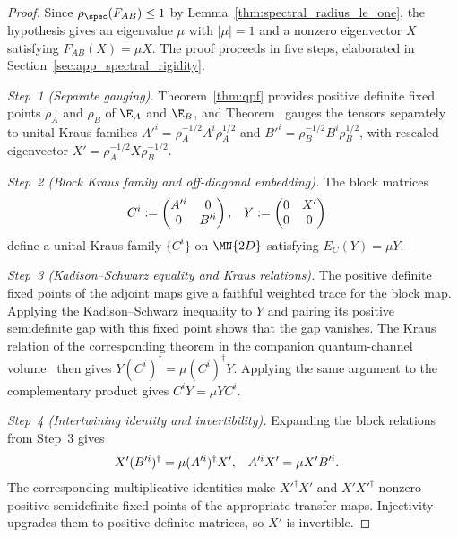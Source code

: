 \begin{proof}
    \leanok
    Since $\rho_{\spec}(F_{AB})\leq1$ by
    Lemma~\ref{thm:spectral_radius_le_one}, the hypothesis gives an
    eigenvalue $\mu$ with $|\mu|=1$ and a nonzero eigenvector $X$ satisfying
    $F_{AB}(X)=\mu X$. The proof proceeds in five steps, elaborated in
    Section~\ref{sec:app_spectral_rigidity}.

    \emph{Step~1 (Separate gauging).}
    Theorem~\ref{thm:qpf} provides positive definite fixed points $\rho_A$ and
    $\rho_B$ of $\E_A$ and $\E_B$, and
    Theorem~\cite[``Right-canonical (unital) gauge'']{QICLean2026Blueprint}
    gauges the tensors separately to unital Kraus families
    $A'^i=\rho_A^{-1/2}A^i\rho_A^{1/2}$ and $B'^i=\rho_B^{-1/2}B^i\rho_B^{1/2}$,
    with rescaled eigenvector $X'=\rho_A^{-1/2}X\rho_B^{-1/2}$.

    \emph{Step~2 (Block Kraus family and off-diagonal embedding).}
    The block matrices
    \begin{align}
        C^i
         & :=
        \begin{pmatrix}
            A'^i & 0    \\
            0    & B'^i
        \end{pmatrix},
         &
        Y
         & :=
        \begin{pmatrix}
            0 & X' \\
            0 & 0
        \end{pmatrix}
        \notag
    \end{align}
    define a unital Kraus family $\{C^i\}$ on $\MN{2D}$ satisfying
    $E_C(Y)=\mu Y$.

    \emph{Step~3 (Kadison--Schwarz equality and Kraus relations).}
    The positive definite fixed points of the adjoint maps give a faithful
    weighted trace for the block map. Applying the Kadison--Schwarz
    inequality to $Y$ and pairing its positive semidefinite gap with this
    fixed point shows that the gap vanishes. The Kraus relation of
    the corresponding theorem in the companion quantum-channel volume~\cite[``KS equality implies Kraus commutation'']{QICLean2026Blueprint} then gives
    $Y(C^i)^\dagger=\mu(C^i)^\dagger Y$. Applying the same argument to the
    complementary product gives $C^iY=\mu YC^i$.

    \emph{Step~4 (Intertwining identity and invertibility).}
    Expanding the block relations from Step~3 gives
    \begin{align}
        X'(B'^i)^\dagger
         & =\mu(A'^i)^\dagger X',
         &
        A'^iX'
         & =\mu X'B'^i.
        \notag
    \end{align}
    The corresponding multiplicative identities make $X'^\dagger X'$ and
    $X'X'^\dagger$ nonzero positive semidefinite fixed points of the
    appropriate transfer maps. Injectivity upgrades them to positive
    definite matrices, so $X'$ is invertible.


\end{proof}
